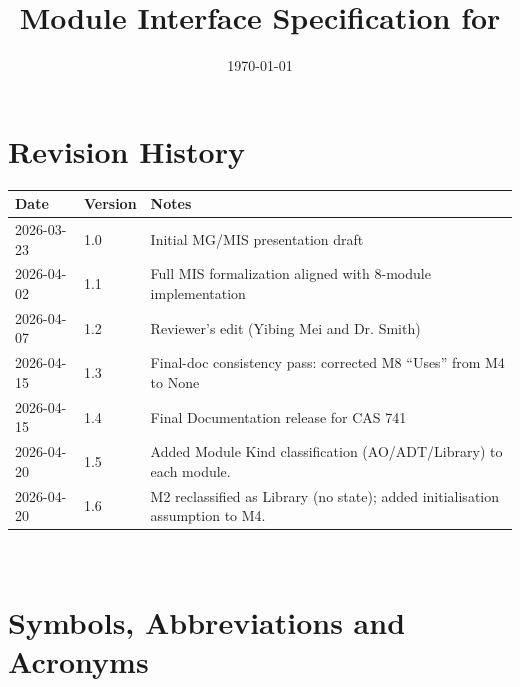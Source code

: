\documentclass[12pt, titlepage]{article}
\begin{document}
\title{Module Interface Specification for \progname{}}

\author{\authname}

\date{\today}

\maketitle


\section{Revision History}

\begin{tabularx}{\textwidth}{p{3cm}p{2cm}X}
\toprule {\bf Date} & {\bf Version} & {\bf Notes}\\
\midrule
2026-03-23 & 1.0 & Initial MG/MIS presentation draft\\
2026-04-02 & 1.1 & Full MIS formalization aligned with 8-module implementation\\
2026-04-07 & 1.2 & Reviewer's edit (Yibing Mei and Dr. Smith)\\
2026-04-15 & 1.3 & Final-doc consistency pass: corrected M8 ``Uses'' from M4 to None\\
2026-04-15 & 1.4 & Final Documentation release for CAS 741\\
2026-04-20 & 1.5 & Added Module Kind classification (AO/ADT/Library) to each module.\\
2026-04-20 & 1.6 & M2 reclassified as Library (no state); added initialisation assumption to M4.\\
\bottomrule
\end{tabularx}

~\newpage

\section{Symbols, Abbreviations and Acronyms}
\end{document}
